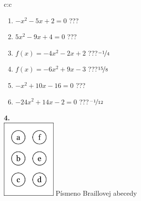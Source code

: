 \documentclass[10pt]{report}
\begin{document}
\begin{tabular}{c:c}
\begin{minipage}[c][104.5mm][t]{0.5\linewidth}
\begin{center}
\begin{minipage}{0.79\linewidth}
\begin{center}
\begin{varwidth}{\linewidth}
\begin{enumerate}
\Large
\item $-x^2-5x+2=0$\quad \dotfill\; ???\;\dotfill {}
\item $5x^2-9x+4=0$\quad \dotfill\; ???\;\dotfill {}
\item $f(x)=-4x^2-2x+2$\quad \dotfill\; ???\;\dotfill \quad $\nicefrac{-1}{4}$
\item $f(x)=-6x^2+9x-3$\quad \dotfill\; ???\;\dotfill \quad $\nicefrac{15}{8}$
\item $-x^2+10x-16=0$\quad \dotfill\; ???\;\dotfill {}
\item $-24x^2+14x-2=0$\quad \dotfill\; ???\;\dotfill \quad $\nicefrac{-1}{12}$
\end{enumerate}
\end{varwidth}
\end{center}
\end{minipage}
\begin{minipage}{0.20\linewidth}
\begin{center}
{\Huge\bfseries 4.} \\[2mm]
\includegraphics[height=40mm]{../images/braille.png}
{\small Písmeno Braillovej abecedy}
\end{center}
\end{minipage}
\end{center}
\end{minipage}
%
\end{tabular}
\newpage
\thispagestyle{empty}
\end{document}
